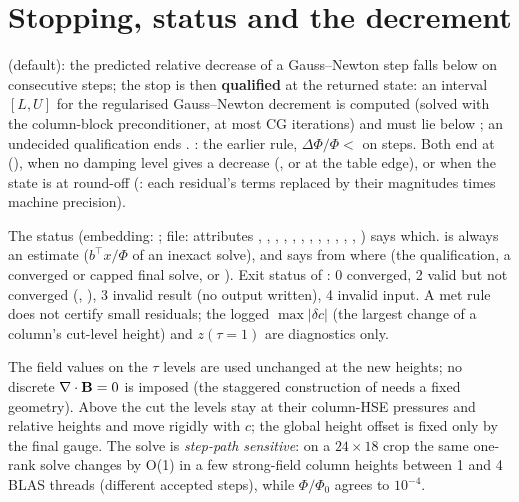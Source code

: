 \section{Stopping, status and the decrement}\label{sec:stop}
\textbf{} (default): the predicted relative decrease of a Gauss--Newton step falls below  on
 consecutive steps; the stop is then \textbf{qualified} at the returned state: an interval $[L,U]$ for the
regularised Gauss--Newton decrement is computed (solved with the column-block preconditioner, at most  CG
iterations) and must lie below ; an undecided qualification ends . \textbf{}: the
earlier rule, $\Delta\Phi/\Phi<$  on  steps. Both end at  (), when no
damping level gives a decrease (, or  at the table edge), or when the state is at
round-off (: each residual's terms replaced by their magnitudes times machine precision).

The status (embedding: ; file: attributes , , ,
, , , , , ,
, , , ) says which.  is always an estimate
($b^\top x/\Phi$ of an inexact solve), and  says from where (the qualification, a converged or capped
final solve, or ). Exit status of : 0 converged, 2 valid but not converged
(, ), 3 invalid result (no output written), 4 invalid input. A met rule does not certify small
residuals; the logged $\max|\delta c|$ (the largest change of a column's cut-level height) and $z(\tau{=}1)$ are diagnostics only.



The field values on the $\tau$ levels are used unchanged at the new heights; no discrete $\nabla\cdot\mathbf B=0$ is imposed (the
staggered construction of  needs a fixed geometry). Above the cut the levels stay at their column-HSE
pressures and relative heights and move rigidly with $c$; the global height offset is fixed only by the final gauge. The solve
is \emph{step-path sensitive}: on a $24\times18$ crop the same one-rank solve changes by O(1) in a few strong-field column
heights between 1 and 4 BLAS threads (different accepted steps), while $\Phi/\Phi_0$ agrees to $10^{-4}$.

